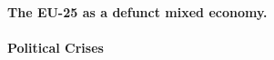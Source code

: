 \documentclass[11pt,a4paper,oneside,english]{article}
\begin{document}

\paragraph{The EU-25 as a defunct mixed economy.}






\paragraph{Political Crises}


\end{document}
